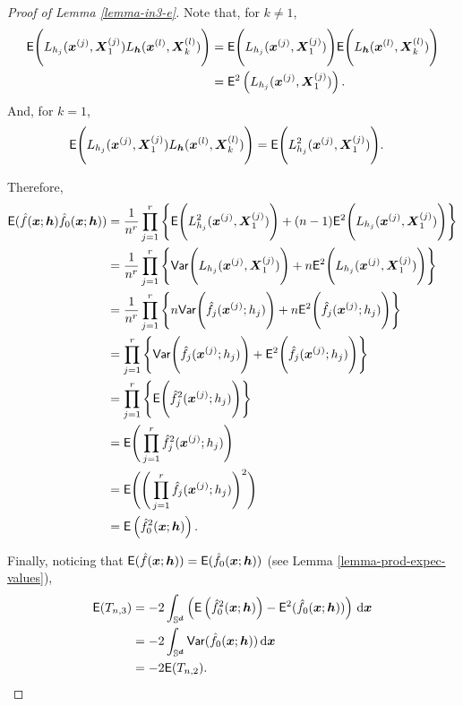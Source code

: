 \documentclass[oneside,11pt]{article}
\begin{document}
\begin{proof}[Proof of Lemma \ref{lemma-in3-e}]
Note that, for $k \ne 1$,
\begin{align*}
    \mathsf{E} \Bigg( L_{h_j} (\boldsymbol{x}^{(j)}, \boldsymbol{X}_1^{(j)}) L_{{\boldsymbol{h}}} (\boldsymbol{x}^{(l)}, \boldsymbol{X}_k^{(l)}) \Bigg) &= \mathsf{E} \Bigg( L_{h_j} (\boldsymbol{x}^{(j)}, \boldsymbol{X}_1^{(j)}) \Bigg) \mathsf{E} \Bigg(L_{{\boldsymbol{h}}} (\boldsymbol{x}^{(l)}, \boldsymbol{X}_k^{(l)}) \Bigg) \\
    &= \mathsf{E}^2 \left( L_{h_j} (\boldsymbol{x}^{(j)}, \boldsymbol{X}_1^{(j)}) \right).
\end{align*}
And, for $k=1$,
\begin{align*}
    \mathsf{E} \Bigg( L_{h_j} (\boldsymbol{x}^{(j)}, \boldsymbol{X}_1^{(j)}) L_{{\boldsymbol{h}}} (\boldsymbol{x}^{(l)}, \boldsymbol{X}_k^{(l)}) \Bigg) &= \mathsf{E} \Bigg( L_{h_j}^2 (\boldsymbol{x}^{(j)}, \boldsymbol{X}_1^{(j)})  \Bigg).
\end{align*}

Therefore,
\begin{align*}
    \mathsf{E} (\hat{f}(\boldsymbol{x};{\boldsymbol{h}}) \hat{f}_{0}(\boldsymbol{x};{\boldsymbol{h}})) &= \frac{1}{n^{r}} \prod_{j=1}^{r} \Bigg\{ \mathsf{E} \Bigg( L_{h_j}^2 (\boldsymbol{x}^{(j)}, \boldsymbol{X}_1^{(j)}) \Bigg) + (n-1) \mathsf{E}^2 \Bigg( L_{h_j} (\boldsymbol{x}^{(j)}, \boldsymbol{X}_1^{(j)}) \Bigg) \Bigg\} \\
    &= \frac{1}{n^{r}} \prod_{j=1}^{r} \Bigg\{ \mathsf{Var} \Bigg( L_{h_j} (\boldsymbol{x}^{(j)}, \boldsymbol{X}_1^{(j)}) \Bigg) + n \mathsf{E}^2 \Bigg( L_{h_j} (\boldsymbol{x}^{(j)}, \boldsymbol{X}_1^{(j)}) \Bigg) \Bigg\} \\
    &= \frac{1}{n^{r}} \prod_{j=1}^{r} \Bigg\{ n \mathsf{Var} \Bigg( \hat{f}_j (\boldsymbol{x}^{(j)}; h_j ) \Bigg) + n \mathsf{E}^2 \Bigg( \hat{f}_j (\boldsymbol{x}^{(j)}; h_j ) \Bigg) \Bigg\} \\
    &= \prod_{j=1}^{r} \Bigg\{ \mathsf{Var} \Bigg( \hat{f}_j (\boldsymbol{x}^{(j)}; h_j ) \Bigg) + \mathsf{E}^2 \Bigg( \hat{f}_j (\boldsymbol{x}^{(j)}; h_j ) \Bigg) \Bigg\} \\
    &= \prod_{j=1}^{r} \Bigg\{ \mathsf{E} \Bigg( \hat{f}_j^2 (\boldsymbol{x}^{(j)}; h_j ) \Bigg) \Bigg\} \\
    &= \mathsf{E} \Bigg( \prod_{j=1}^{r} \hat{f}_j^2 (\boldsymbol{x}^{(j)}; h_j ) \Bigg) \\
    &= \mathsf{E} \Bigg( \Bigg( \prod_{j=1}^{r} \hat{f}_j (\boldsymbol{x}^{(j)}; h_j ) \Bigg)^2 \Bigg) \\
    &= \mathsf{E}\left(\hat{f}_0^2 (\boldsymbol{x}; {\boldsymbol{h}})\right).
\end{align*}

Finally, noticing that $\mathsf{E} (\hat{f}(\boldsymbol{x};{\boldsymbol{h}})) = \mathsf{E} (\hat{f}_{0}(\boldsymbol{x};{\boldsymbol{h}}))$ (see Lemma \ref{lemma-prod-expec-values}),
\begin{align*}
    \mathsf{E} (T_{n,3}) &= -2 \int_{\mathbb{S}^{\boldsymbol{d}}}  \left( \mathsf{E}\left(\hat{f}_0^2 (\boldsymbol{x}; {\boldsymbol{h}})\right) - \mathsf{E}^2 (\hat{f}_{0}(\boldsymbol{x};{\boldsymbol{h}}))  \right) \,\mathrm{d} \boldsymbol{x} \\
    &= -2 \int_{\mathbb{S}^{\boldsymbol{d}}}  \mathsf{Var} (\hat{f}_{0}(\boldsymbol{x};{\boldsymbol{h}})) \,\mathrm{d} \boldsymbol{x} \\
    &= -2   \mathsf{E} (T_{n,2}).
\end{align*}
\end{proof}
\end{document}
